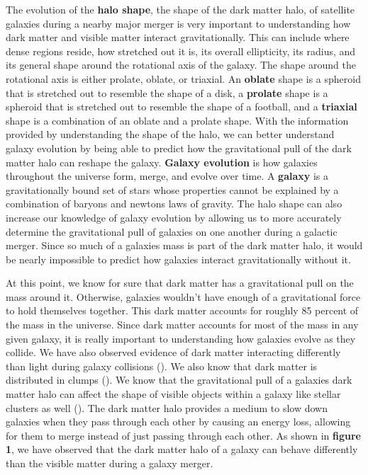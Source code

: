 \documentclass[fleqn,usenatbib]{mnras}
\begin{document}
        The evolution of the \textbf{halo shape}, the shape of the dark matter halo, of satellite galaxies during a nearby major merger is very important to understanding how dark matter and visible matter interact gravitationally. This can include where dense regions reside, how stretched out it is, its overall ellipticity, its radius, and its general shape around the rotational axis of the galaxy. The shape around the rotational axis is either prolate, oblate, or triaxial. An \textbf{oblate} shape is a spheroid that is stretched out to resemble the shape of a disk, a \textbf{prolate} shape is a spheroid that is stretched out to resemble the shape of a football, and a \textbf{triaxial} shape is a combination of an oblate and a prolate shape. With the information provided by understanding the shape of the halo, we can better understand galaxy evolution by being able to predict how the gravitational pull of the dark matter halo can reshape the galaxy. \textbf{Galaxy evolution} is how galaxies throughout the universe form, merge, and evolve over time. A \textbf{galaxy} is a gravitationally bound set of stars whose properties cannot be explained by a combination of baryons and newtons laws of gravity. The halo shape can also increase our knowledge of galaxy evolution by allowing us to more accurately determine the gravitational pull of galaxies on one another during a galactic merger. Since so much of a galaxies mass is part of the dark matter halo, it would be nearly impossible to predict how galaxies interact gravitationally without it. 

        At this point, we know for sure that dark matter has a gravitational pull on the mass around it. Otherwise, galaxies wouldn't have enough of a gravitational force to hold themselves together. This dark matter accounts for roughly 85 percent of the mass in the universe. Since dark matter accounts for most of the mass in any given galaxy, it is really important to understanding how galaxies evolve as they collide. We have also observed evidence of dark matter interacting differently than light during galaxy collisions (\citet{Clowe2006}). We also know that dark matter is distributed in clumps (\citet{Banik2018}). We know that the gravitational pull of a galaxies dark matter halo can affect the shape of visible objects within a galaxy like stellar clusters as well (\citet{Erkal2017}). The dark matter halo provides a medium to slow down galaxies when they pass through each other by causing an energy loss, allowing for them to merge instead of just passing through each other. As shown in \textbf{figure 1}, we have observed that the dark matter halo of a galaxy can behave differently than the visible matter during a galaxy merger.
        
\end{document}
